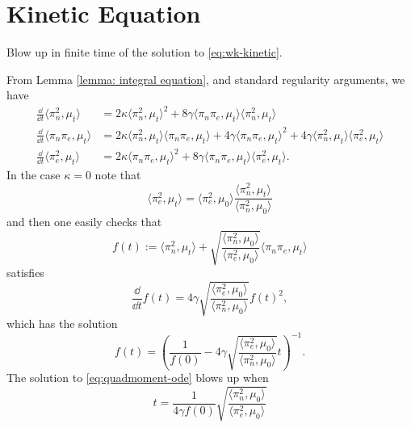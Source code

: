 \section{Kinetic Equation}

Blow up in finite time of the solution to \eqref{eq:wk-kinetic}.

From Lemma \ref{lemma: integral equation}, and standard regularity arguments, we have 
\begin{align}
    \frac{\dd}{\dd t}\langle \pi_n^2, \mu_t\rangle &=
    2\kappa \langle \pi_n^2, \mu_t\rangle^2
    + 8 \gamma \langle \pi_n \pi_e, \mu_t\rangle\langle \pi_n^2, \mu_t\rangle\\
    \frac{\dd}{\dd t}\langle \pi_n \pi_e, \mu_t\rangle &=
    2\kappa \langle \pi_n^2, \mu_t\rangle \langle \pi_n \pi_e, \mu_t\rangle
    + 4 \gamma \langle \pi_n \pi_e, \mu_t\rangle^2
    + 4 \gamma \langle \pi_n^2, \mu_t\rangle\langle \pi_e^2, \mu_t\rangle\\
    \frac{\dd}{\dd t}\langle \pi_e^2, \mu_t\rangle &=
    2\kappa \langle \pi_n \pi_e, \mu_t\rangle^2
    + 8 \gamma \langle \pi_n \pi_e, \mu_t\rangle\langle \pi_e^2, \mu_t\rangle.
\end{align}
In the case $\kappa = 0$ note that
\begin{equation}\label{eq:proportional}
    \langle \pi_e^2, \mu_t\rangle = \langle \pi_e^2, \mu_0\rangle
    \frac{\langle \pi_n^2, \mu_t\rangle}{\langle \pi_n^2, \mu_0\rangle}
\end{equation}
and then one easily checks that
\begin{equation}
    f(t) := \langle \pi_n^2, \mu_t\rangle
           + \sqrt{\frac{\langle \pi_n^2, \mu_0\rangle}
                        {\langle \pi_e^2, \mu_0\rangle}}
             \langle \pi_n \pi_e, \mu_t\rangle
\end{equation}
satisfies
\begin{equation}
    \frac{\dd }{\dd t}f(t) = 4\gamma 
    \sqrt{\frac{\langle \pi_e^2, \mu_0\rangle}
                        {\langle \pi_n^2, \mu_0\rangle}}f(t)^2,
\end{equation}
which has the solution
\begin{equation}\label{eq:quadmoment-ode}
    f(t) = \left(\frac{1}{f(0)} - 4\gamma 
    \sqrt{\frac{\langle \pi_e^2, \mu_0\rangle}
                        {\langle \pi_n^2, \mu_0\rangle}}t \right)^{-1}.
\end{equation}
The solution to \eqref{eq:quadmoment-ode} blows up when
\begin{equation}\label{eq:quad-tgel}
    t = \frac{1}{4\gamma f(0)}
             \sqrt{\frac{\langle \pi_n^2, \mu_0\rangle}
                        {\langle \pi_e^2, \mu_0\rangle}}
\end{equation}

